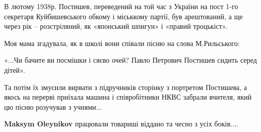  
 
 
 
 


В лютому 1938р. Постишев, переведений на той час з України на пост 1-го
секретаря Куйбишевського обкому і міськкому партії, був арештований, а ще через
рік – розстріляний, як «японський шпигун» і «правий троцькіст».

Моя мама згадувала, як в школі вони співали пісню на слова М.Рильського:

«...Чи бачите ви посмішки і сяєво очей?
Павло Петрович Постишев сидить серед дітей».

Та потім їх змусили вирвати з підручників сторінку з портретом Постишева, а
якось на перерві приїхала машина і співробітники НКВС забрали вчителя, який цю
пісню розучував з учнями...

\textbf{Maksym Oleynikov} працювали товариші віддано та чесно з усіх боків....
